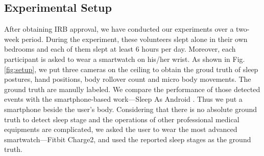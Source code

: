 \subsection{Experimental Setup}
After obtaining IRB approval, we have conducted our experiments over a two-week period. During the experiment, these volunteers slept alone in their own bedrooms and each of them slept at least 6 hours per day. Moreover, each participant is asked to wear a smartwatch on his/her wrist. As shown in Fig. \ref{fig:setup}, we put three cameras on the ceiling to obtain the groud truth of sleep postures, hand positions, body rollover count and micro body movements. The ground truth are manully labeled. We compare the performance of those detected events with the smartphone-based work---Sleep As Android \cite{SleepAndroid}. Thus we put a smartphone beside
the user's body. Considering that there is no absolute ground truth to detect sleep stage and the operations of other professional medical equipments are complicated, we asked the user to wear the most advanced smartwatch---Fitbit Charge2, and used the reported sleep stages as the ground truth.  
